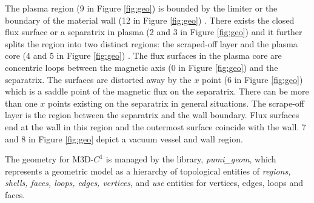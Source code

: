 \documentclass[11pt]{article}  %
\begin{document}
The plasma region (9 in Figure \ref{fig:geo}) is bounded by the limiter or the boundary of the material wall (12 in Figure \ref{fig:geo}) \cite{wesson2011tokamaks}. There exists the closed flux surface or a separatrix in plasma (2 and 3 in Figure \ref{fig:geo}) and  it further splits the region into two distinct regions: the scraped-off layer and the plasma core (4 and 5 in Figure \ref{fig:geo}) \cite{wesson2011tokamaks}. The flux surfaces in the plasma core are concentric loops between the magnetic axis (0 in Figure \ref{fig:geo}) and the separatrix. The surfaces are distorted away by the $x$ point (6 in Figure \ref{fig:geo}) which is a saddle point of the magnetic flux on the separatrix.  There can be more than one $x$ points existing on the separatrix in general situations. The scrape-off layer is the region between the separatrix and the wall boundary. Flux surfaces end at the wall in this region and the outermost surface coincide with the wall. 7 and 8 in Figure \ref{fig:geo} depict a vacuum vessel and wall region.  

The geometry for M3D-$C^1$ is managed by the library, \emph{pumi\_geom}, which represents a geometric model as a hierarchy of topological entities of \emph{regions, shells, faces, loops, edges, vertices}, and \emph{use} entities for vertices, edges, loops and faces. 
\end{document}
